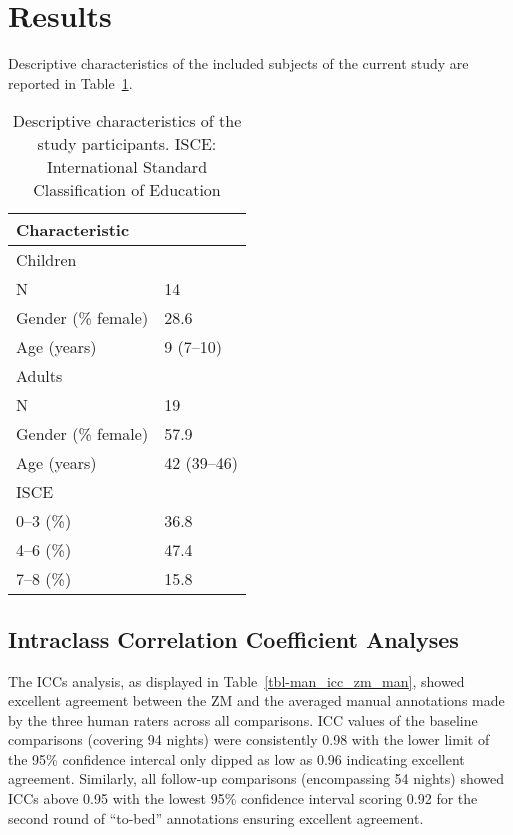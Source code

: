 \documentclass[
  10pt,
]{scrbook}
\begin{document}
\pagebreak

\hypertarget{results}{%
\section{Results}\label{results}}

Descriptive characteristics of the included subjects of the current
study are reported in Table~\ref{tbl-man_describe}.

\begingroup

\footnotesize

\hypertarget{tbl-man_describe}{}
\begin{longtable}{ll}
\caption{\label{tbl-man_describe}Descriptive characteristics of the study participants. ISCE:
International Standard Classification of Education }\tabularnewline

\toprule
Characteristic &  \\ 
\midrule
\multicolumn{2}{l}{Children} \\ 
\midrule
N & 14 \\ 
Gender (\% female) & 28.6 \\ 
Age (years) & 9 (7–10) \\ 
\midrule
\multicolumn{2}{l}{Adults} \\ 
\midrule
N & 19 \\ 
Gender (\% female) & 57.9 \\ 
Age (years) & 42 (39–46) \\ 
ISCE &  \\ 
0–3 (\%) & 36.8 \\ 
4–6 (\%) & 47.4 \\ 
7–8 (\%) & 15.8 \\ 
\bottomrule
\end{longtable}

\endgroup

\hypertarget{intraclass-correlation-coefficient-analyses}{%
\subsection{Intraclass Correlation Coefficient
Analyses}\label{intraclass-correlation-coefficient-analyses}}

The ICCs analysis, as displayed in Table~\ref{tbl-man_icc_zm_man},
showed excellent agreement between the ZM and the averaged manual
annotations made by the three human raters across all comparisons. ICC
values of the baseline comparisons (covering 94 nights) were
consistently 0.98 with the lower limit of the 95\% confidence intercal
only dipped as low as 0.96 indicating excellent agreement. Similarly,
all follow-up comparisons (encompassing 54 nights) showed ICCs above
0.95 with the lowest 95\% confidence interval scoring 0.92 for the
second round of ``to-bed'' annotations ensuring excellent agreement.
\end{document}
